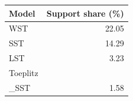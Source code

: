 \begin{tabular}{lr}
\hline
Model & Support share (\%) \\
\hline
WST & 22.05 \\
SST & 14.29 \\
LST & 3.23 \\
Toeplitz\\_SST & 1.58 \\
\hline
\end{tabular}
